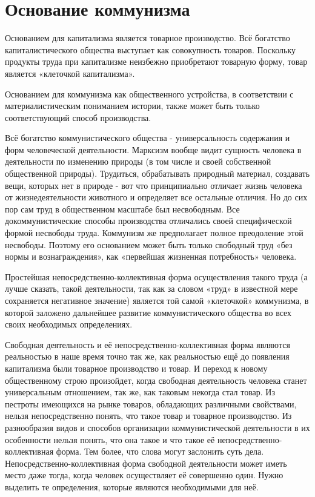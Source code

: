 \documentclass[../main]{subfiles}
\begin{document}
\ifSubfilesClassLoaded{\setcounter{page}{14}}{}
\section{Основание коммунизма}
\label{sec:03_osnovanie}

Основанием для капитализма является товарное производство. Всё богатство капиталистического общества выступает как совокупность товаров. Поскольку продукты труда при капитализме неизбежно приобретают товарную форму, товар является «клеточкой капитализма».

Основанием для коммунизма как общественного устройства, в соответствии с материалистическим пониманием истории, также может быть только соответствующий способ производства.

Всё богатство коммунистического общества - универсальность содержания и форм человеческой деятельности. Марксизм вообще видит сущность человека в деятельности по изменению природы (в том числе и своей собственной общественной природы). Трудиться, обрабатывать природный материал, создавать вещи, которых нет в природе - вот что принципиально отличает жизнь человека от жизнедеятельности животного и определяет все остальные отличия. Но до сих пор сам труд в общественном масштабе был несвободным. Все докоммунистические способы производства отличались своей специфической формой несвободы труда. Коммунизм же предполагает полное преодоление этой несвободы. Поэтому его основанием может быть только свободный труд «без нормы и вознаграждения», как «первейшая жизненная потребность» человека.

Простейшая непосредственно-коллективная форма осуществления такого труда (а лучше сказать, такой деятельности, так как за словом «труд» в известной мере сохраняется негативное значение) является той самой «клеточкой» коммунизма, в которой заложено дальнейшее развитие коммунистического общества во всех своих необходимых определениях.

Свободная деятельность и её непосредственно-коллективная форма являются реальностью в наше время точно так же, как реальностью ещё до появления капитализма были товарное производство и товар. И переход к новому общественному строю произойдет, когда свободная деятельность человека станет универсальным отношением, так же, как таковым некогда стал товар. Из пестроты имеющихся на рынке товаров, обладающих различными свойствами, нельзя непосредственно понять, что такое товар и товарное производство. Из разнообразия видов и способов организации коммунистической деятельности в их особенности нельзя понять, что она такое и что такое её непосредственно-коллективная форма. Тем более, что слова могут заслонить суть дела. Непосредственно-коллективная форма свободной деятельности может иметь место даже тогда, когда человек осуществляет её совершенно один. Нужно выделить те определения, которые являются необходимыми для неё.
\end{document}
